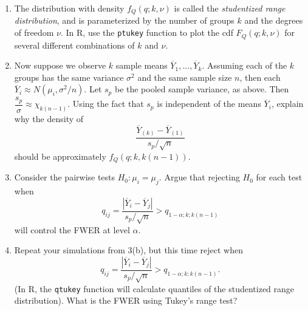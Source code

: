 \documentclass[11pt]{article}
\begin{document}
\begin{enumerate}
\begin{enumerate}
\item The distribution with density $f_Q(q; k, \nu)$ is called the \textit{studentized range distribution}, and is parameterized by the number of groups $k$ and the degrees of freedom $\nu$. In R, use the \texttt{ptukey} function to plot the cdf $F_Q(q; k, \nu)$ for several different combinations of $k$ and $\nu$.

\item Now suppose we observe $k$ sample means $\overline{Y}_1, ..., \overline{Y}_k$. Assuming each of the $k$ groups has the same variance $\sigma^2$ and the same sample size $n$, then each $\overline{Y}_i \approx N(\mu_i, \sigma^2/n)$. Let $s_p$ be the pooled sample variance, as above. Then $\dfrac{s_p}{\sigma} \approx \chi_{k(n-1)}$. Using the fact that $s_p$ is independent of the means $\overline{Y}_i$, explain why the density of
$$\dfrac{\overline{Y}_{(k)} - \overline{Y}_{(1)}}{s_p/\sqrt{n}}$$
should be approximately $f_Q(q; k, k(n-1))$.

\item Consider the pairwise tests $H_0: \mu_i = \mu_j$. Argue that rejecting $H_0$ for each test when 
$$q_{ij} = \dfrac{|\overline{Y}_i - \overline{Y}_j|}{s_p /\sqrt{n}} > q_{1 - \alpha; k; k(n - 1)}$$
will control the FWER at level $\alpha$.

\item Repeat your simulations from 3(b), but this time reject when 
$$q_{ij} = \dfrac{|\overline{Y}_i - \overline{Y}_j|}{s_p /\sqrt{n}} > q_{1 - \alpha; k; k(n - 1)}.$$
(In R, the \texttt{qtukey} function will calculate quantiles of the studentized range distribution). What is the FWER using Tukey's range test?
\end{enumerate}
\end{enumerate}
\end{document}
